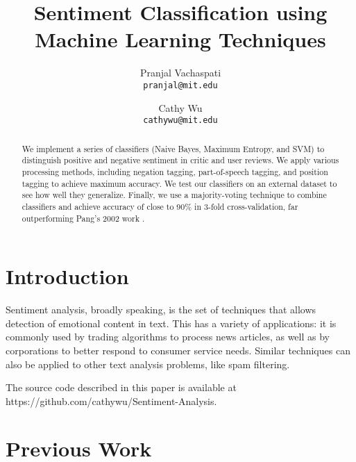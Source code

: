 \documentclass[10pt,twocolumn,letterpaper]{article}
\begin{document}
\title{Sentiment Classification using Machine Learning Techniques}

\author{Pranjal Vachaspati\\
{\tt\small pranjal@mit.edu}
\and
Cathy Wu\\
{\tt\small cathywu@mit.edu}
}

\maketitle
\thispagestyle{empty}

\begin{abstract}
We implement a series of classifiers (Naive Bayes, Maximum Entropy, and SVM) to distinguish positive and negative sentiment in critic and user reviews. We apply various processing methods, including negation tagging, part-of-speech tagging, and position tagging to achieve maximum accuracy. We test our classifiers on an external dataset to see how well they generalize. Finally, we use a majority-voting technique to combine classifiers and achieve accuracy of close to 90\% in 3-fold cross-validation, far outperforming Pang's 2002 work \cite{Pang}.
\end{abstract}

\section{Introduction}

Sentiment analysis, broadly speaking, is the set of techniques that allows detection of emotional content in text. This has a variety of applications: it is commonly used by trading algorithms to process news articles, as well as by corporations to better respond to consumer service needs. Similar techniques can also be applied to other text analysis problems, like spam filtering.

The source code described in this paper is available at https://github.com/cathywu/Sentiment-Analysis.

\section{Previous Work}
\end{document}
